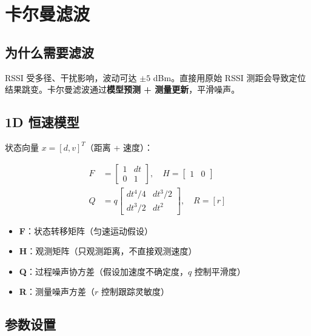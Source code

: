 \documentclass[11pt,a4paper]{article}
\begin{document}
\section{卡尔曼滤波}

\subsection{为什么需要滤波}

RSSI 受多径、干扰影响，波动可达 $\pm 5$ dBm。直接用原始 RSSI 测距会导致定位结果跳变。卡尔曼滤波通过\textbf{模型预测 + 测量更新}，平滑噪声。

\subsection{1D 恒速模型}

状态向量 $x = [d, v]^T$（距离 + 速度）：

\begin{align}
F &= \begin{bmatrix} 1 & dt \\ 0 & 1 \end{bmatrix}, \quad
H = \begin{bmatrix} 1 & 0 \end{bmatrix} \\[4pt]
Q &= q \begin{bmatrix} dt^4/4 & dt^3/2 \\ dt^3/2 & dt^2 \end{bmatrix}, \quad
R = [r]
\end{align}

\begin{itemize}
    \item \textbf{F}：状态转移矩阵（匀速运动假设）
    \item \textbf{H}：观测矩阵（只观测距离，不直接观测速度）
    \item \textbf{Q}：过程噪声协方差（假设加速度不确定度，$q$ 控制平滑度）
    \item \textbf{R}：测量噪声方差（$r$ 控制跟踪灵敏度）
\end{itemize}

\subsection{参数设置}
\end{document}
